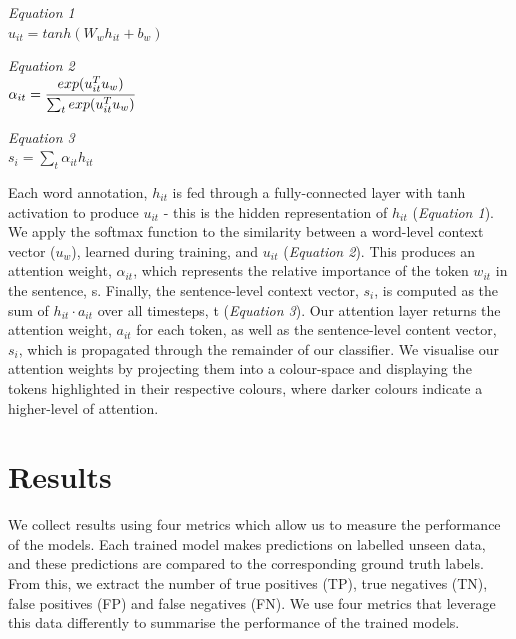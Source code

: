 \documentclass[12pt,a4paper]{article}
\begin{document}
\begin{center}
	\hspace{25pt}\begin{minipage}{0.35\textwidth}
		\textit{Equation 1}\hfill\\\vspace{16pt}
		$u_{it} = tanh(W_wh_{it} + b_w)$
	\end{minipage}
	\begin{minipage}{0.29\textwidth}
		\textit{Equation 2}\hfill\\ $\alpha_{it} = \cfrac{exp(u_{it}^{T}u_w)}{\sum_{t}exp(u_{it}^{T}u_w)}$
	\end{minipage}
	\hspace{5pt}
	\begin{minipage}{0.27\textwidth}
		\textit{Equation 3}\hfill\\\vspace{16pt}$s_i = \sum_{t}\alpha_{it}h_{it}$
	\end{minipage}
\end{center}

\noindent Each word annotation, $h_{it}$ is fed through a fully-connected layer with tanh activation to produce $u_{it}$ - this is the hidden representation of $h_{it}$ (\textit{Equation 1}). We apply the softmax function to the similarity between a word-level context vector ($u_w$), learned during training, and $u_{it}$ (\textit{Equation 2}). This produces an attention weight, $\alpha_{it}$, which represents the relative importance of the token $w_{it}$ in the sentence, s. Finally, the sentence-level context vector, $s_i$, is computed as the sum of $h_{it} \cdot a_{it}$ over all timesteps, t (\textit{Equation 3}). Our attention layer returns the attention weight, $a_{it}$ for each token, as well as the sentence-level content vector, $s_i$, which is propagated through the remainder of our classifier. We visualise our attention weights by projecting them into a colour-space and displaying the tokens highlighted in their respective colours, where darker colours indicate a higher-level of attention.

\section{Results}
\noindent We collect results using four metrics which allow us to measure the performance of the models. Each trained model makes predictions on labelled unseen data, and these predictions are compared to the corresponding ground truth labels. From this, we extract the number of true positives (TP), true negatives (TN), false positives (FP) and false negatives (FN). We use four metrics that leverage this data differently to summarise the performance of the trained models.\vspace{-10pt}
\end{document}
